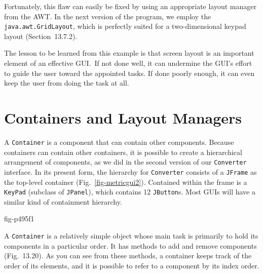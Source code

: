 Fortunately, this flaw can easily be fixed by using an appropriate
layout manager from the AWT. In the next version of the
program, we employ the {\tt java.awt.GridLayout}, which is perfectly suited for
a two-dimensional keypad layout (Section~13.7.2).

The lesson to be learned from this example is that screen layout is an
important element of an effective GUI.~If not done well, it can
undermine the GUI's effort to guide the user toward the appointed
tasks.  If done poorly enough, it can even keep the user from doing the
task at all.






\section{Containers and Layout Managers}
\noindent A {\tt Container} is a component that can contain other components.
Because containers can contain other containers, it is possible to
create a hierarchical arrangement of components, as we did in the
second version of our {\tt Converter} interface.  In its present form,
the hierarchy for {\tt Converter} consists of a {\tt JFrame} as the
top-level container (Fig.~\ref{fig-metricgui2}). Contained within
the frame is a {\tt KeyPad} (subclass of {\tt JPanel}), which contains 12 {\tt JButton}s.
Most GUIs will have a similar kind of containment hierarchy.


{fig-p495f1}


A {\tt Container} is a relatively simple object whose main task is
primarily to hold its components in a particular order.  It has
methods to add and remove components (Fig.~13.20).  As you
can see from these methods, a container keeps track of the order of
its elements, and it is possible to refer to a component by its index
order.

